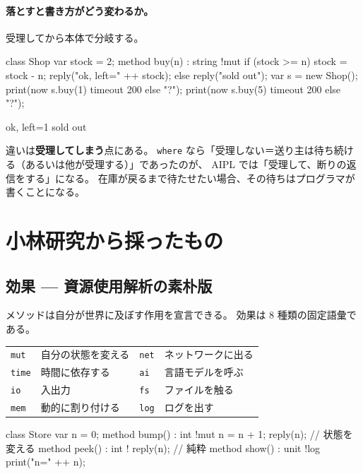 \documentclass[11pt,a4paper]{ltjsarticle}
\theoremstyle{definition}
\theoremstyle{remark}
\begin{document}
\paragraph{落とすと書き方がどう変わるか。}
受理してから本体で分岐する。

\begin{aipl}
class Shop {
  var stock = 2;
  method buy(n) : string !{mut} {
    if (stock >= n) { stock = stock - n; reply("ok, left=" ++ stock); }
    else { reply("sold out"); }
  }
}
var s = new Shop();
print(now s.buy(1) timeout 200 else "?");
print(now s.buy(5) timeout 200 else "?");
\end{aipl}
\begin{term}
ok, left=1
sold out
\end{term}

違いは\textbf{受理してしまう}点にある。
\texttt{where} なら「受理しない＝送り主は待ち続ける（あるいは他が受理する）」であったのが、
AIPL では「受理して、断りの返信をする」になる。
在庫が戻るまで待たせたい場合、その待ちはプログラマが書くことになる。

\section{小林研究から採ったもの}
\label{sec:koba-take}

\subsection{効果 --- 資源使用解析の素朴版}
\label{sec:eff}

メソッドは自分が世界に及ぼす作用を宣言できる。
効果は 8 種類の固定語彙である。

\begin{center}
\begin{tabular}{ll@{\qquad}ll}
\toprule
\texttt{mut}  & 自分の状態を変える    & \texttt{net} & ネットワークに出る \\
\texttt{time} & 時間に依存する        & \texttt{ai}  & 言語モデルを呼ぶ \\
\texttt{io}   & 入出力                & \texttt{fs}  & ファイルを触る \\
\texttt{mem}  & 動的に割り付ける      & \texttt{log} & ログを出す \\
\bottomrule
\end{tabular}
\end{center}

\begin{aipl}
class Store {
  var n = 0;
  method bump()  : int !{mut}  { n = n + 1; reply(n); }   // 状態を変える
  method peek()  : int !{}     { reply(n); }              // 純粋
  method show()  : unit !{log} { print("n=" ++ n); }
}
\end{aipl}
\end{document}
